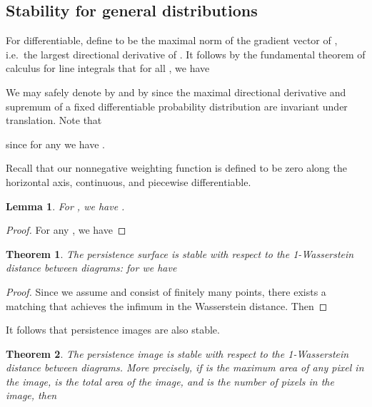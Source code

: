 \documentclass[11pt]{article}
\newtheorem{lemma}{Lemma}
\newtheorem{theorem}{Theorem}
\begin{document}
\subsection{Stability for general distributions}\label{subsec:stability_general}

For  differentiable, define  to be the maximal norm of the gradient vector of , i.e.\ the largest directional derivative of . It follows by the fundamental theorem of calculus for line integrals that for all , we have


We may safely denote  by  and  by  since the maximal directional derivative and supremum of a fixed differentiable probability distribution are invariant under translation. Note that

since for any  we have .

Recall that our nonnegative weighting function  is defined to be zero along the horizontal axis, continuous, and piecewise differentiable.

\begin{lemma}\label{lem:L-infty-rho}
For , we have .
\end{lemma}

\begin{proof}
For any , we have

\end{proof}

\begin{theorem}\label{thm:surface-stable-general}
The persistence surface  is stable with respect to the 1-Wasserstein distance between diagrams: for  we have

\end{theorem}

\begin{proof}
Since we assume  and  consist of finitely many points, there exists a matching  that achieves the infimum in the Wasserstein distance. Then 

\end{proof}

It follows that persistence images are also stable.

\begin{theorem}\label{thm:image-stable-general}
The persistence image  is stable with respect to the 1-Wasserstein distance between diagrams. More precisely, if  is the maximum area of any pixel in the image,  is the total area of the image, and  is the number of pixels in the image, then

\end{theorem}
\end{document}

